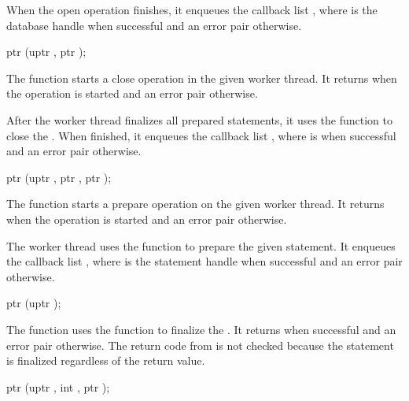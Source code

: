 When the open operation finishes, it enqueues the callback list
, where  is the
database handle when successful and an error pair otherwise.

\begin{function}
  ptr (uptr , ptr );
\end{function}

The  function starts a close operation in
the given  worker thread. It returns  when the
operation is started and an error pair otherwise.

After the worker thread finalizes all prepared statements, it uses the
 function to close the . When
finished, it enqueues the callback list , where  is  when successful and
an error pair otherwise.

\begin{function}
  ptr (uptr , ptr , ptr );
\end{function}

The  function starts a prepare operation
on the given  worker thread. It returns  when
the operation is started and an error pair otherwise.

The worker thread uses the  function to
prepare the given  statement. It enqueues the callback list
, where  is the
statement handle when successful and an error pair otherwise.

\begin{function}
  ptr (uptr );
\end{function}

The  function uses the
 function to finalize the .  It
returns  when successful and an error pair otherwise. The
return code from  is not checked because the
statement is finalized regardless of the return value.

\begin{function}
  ptr (uptr , int , ptr );
\end{function}

